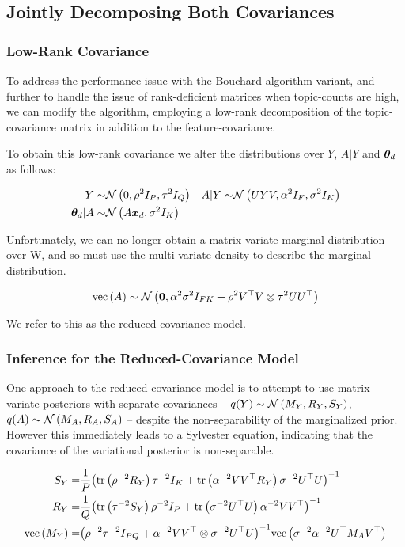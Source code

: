 

\newcommand \Vd[0] { { V^{(d)} } }

\subsection{Jointly Decomposing Both Covariances}
\subsubsection{Low-Rank Covariance}
To address the performance issue with the Bouchard algorithm variant, and further to handle the issue of rank-deficient matrices when topic-counts are high, we can modify the algorithm, employing a low-rank decomposition of the topic-covariance matrix in addition to the feature-covariance.

To obtain this low-rank covariance we alter the distributions over $Y$, $A|Y$ and ${ \bm \theta_d }$ as follows:

\begin{align}
Y \sim & \mathcal{N} \left(0, \rho^2 I_P, \tau^2 I_Q\right) & A|Y \sim & \mathcal{N} \left(UYV, \alpha^2 I_F, \sigma^2 I_K\right) \\
{ \bm \theta_d } | A \sim & \mathcal{N} \left( {A\bm x_d}, {\sigma^2 I_K} \right)
\end{align}

Unfortunately, we can no longer obtain a matrix-variate marginal distribution over W, and so must use the multi-variate density to describe the marginal distribution.  


\begin{align}
\text{vec}\left(A\right) \sim \mathcal{N} \left( {\bm 0}, {\alpha^2 \sigma^2 I_{FK} + \rho^2 V^\top V \otimes \tau^2 U U ^\top} \right)
\end{align}

We refer to this as the reduced-covariance model.

\subsubsection{Inference for the Reduced-Covariance Model}
One approach to the reduced covariance model is to attempt to use matrix-variate posteriors with separate covariances -- $q(Y) \sim \mathcal{N} \left(M_Y, R_Y, S_Y\right)$, $q(A) \sim \mathcal{N} \left(M_A, R_A, S_A\right)$ --  despite the non-separability of the marginalized prior. However this immediately leads to a Sylvester equation, indicating that the covariance of the variational posterior is non-separable.

\begin{align}
S_Y = & \frac{1}{P}{\left( \text{tr} \left( {\rho^{-2} R_Y} \right)\tau^{-2}I_K + \text{tr} \left( {\alpha^{-2}V V^\top R_Y} \right) \sigma^{-2}U^\top U  \right)}^{-1} \\
R_Y = & \frac{1}{Q}{\left( \text{tr} \left( {\tau^{-2} S_Y} \right)\rho^{-2}I_P + \text{tr} \left( {\sigma^{-2} U^\top U} \right) \alpha^{-2} V V^\top \right)}^{-1} \\
\text{vec}\left(M_Y\right) = & {\left( \rho^{-2}\tau^{-2} I_{PQ} + \alpha^{-2}V V^\top \otimes \sigma^{-2} U ^\top U \right)}^{-1}\text{vec}\left(\sigma^{-2}\alpha^{-2} U^\top M_A V^\top\right)
\end{align}

